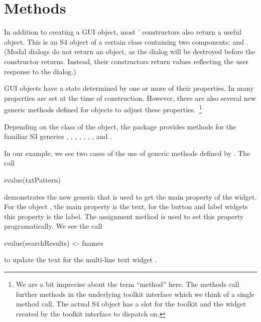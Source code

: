 \section{Methods}


In addition to creating a GUI object, most '
constructors also return a useful \R\/ object. This is an S4 object of
a certain class containing two components:  and
. (Modal dialogs do not return an object, as the dialog
will be destroyed before the constructor returns. Instead, their
constructors return values reflecting the user response to the
dialog.)


GUI objects have a state determined by one or more of their
properties. In  many properties are set at the time of
construction. However, there are also several new generic methods defined
for  objects to adjust these properties.~\footnote{ We
  are a bit imprecise about the term ``method'' here. The
   methods call further methods in the underlying
  toolkit interface which we think of a single method call. The actual
  S4 object has a slot for the toolkit and the widget created by the
  toolkit interface to dispatch on.  }

Depending on the class of the object, the  package
provides methods for the familiar S3 generics \generic{[},
\generic{[$<$-}, , , ,
, ,  and
.


In our example, we see two cases of the use of generic methods defined
by . The call
\begin{Schunk}
\begin{Sinput}
 svalue(txtPattern)
\end{Sinput}
\end{Schunk}
%
demonstrates the new generic  that is used to get
the main property of the widget. For the object , the
main property is the text, for the button and label widgets this
property is the label. The  assignment method is
used to set this property programatically. We see the call
\begin{Schunk}
\begin{Sinput}
 svalue(searchResults) <- fnames
\end{Sinput}
\end{Schunk}
to update the text for the multi-line text widget .

